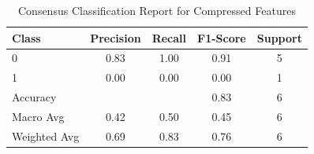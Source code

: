 \documentclass[12pt,a4paper]{report}
\begin{document}
\begin{table}[h!]
    \centering
    \begin{tabular}{l c c c c}
        \toprule
        Class & Precision & Recall & F1-Score & Support \\
        \midrule
        0 & 0.83 & 1.00 & 0.91 & 5 \\
        1 & 0.00 & 0.00 & 0.00 & 1 \\
        \midrule
        Accuracy &       &      & 0.83 & 6 \\
        Macro Avg & 0.42 & 0.50 & 0.45 & 6 \\
        Weighted Avg & 0.69 & 0.83 & 0.76 & 6 \\
        \bottomrule
    \end{tabular}
    \caption[Consensus Classification Report Compressed Features]{Consensus Classification Report for Compressed Features}
    \label{tab:consensus_report_compressed}
\end{table}
\end{document}
